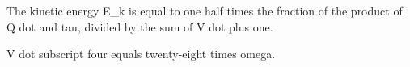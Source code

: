 The kinetic energy E_k is equal to one half times the fraction of the product of Q dot and tau, divided by the sum of V dot plus one.

V dot subscript four equals twenty-eight times omega.